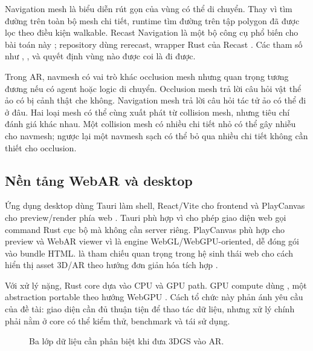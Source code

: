 Navigation mesh là biểu diễn rút gọn của vùng có thể di chuyển. Thay vì tìm đường trên toàn bộ mesh chi tiết, runtime tìm đường trên tập polygon đã được lọc theo điều kiện walkable. Recast Navigation là một bộ công cụ phổ biến cho bài toán này \cite{Recast2009}; repository dùng rerecast, wrapper Rust của Recast \cite{rerecast2023}. Các tham số như , ,  và  quyết định vùng nào được coi là đi được.

Trong AR, navmesh có vai trò khác occlusion mesh nhưng quan trọng tương đương nếu có agent hoặc logic di chuyển. Occlusion mesh trả lời câu hỏi vật thể ảo có bị cảnh thật che không. Navigation mesh trả lời câu hỏi tác tử ảo có thể đi ở đâu. Hai loại mesh có thể cùng xuất phát từ collision mesh, nhưng tiêu chí đánh giá khác nhau. Một collision mesh có nhiều chi tiết nhỏ có thể gây nhiễu cho navmesh; ngược lại một navmesh sạch có thể bỏ qua nhiều chi tiết không cần thiết cho occlusion.

\subsection{Nền tảng WebAR và desktop}

Ứng dụng desktop dùng Tauri làm shell, React/Vite cho frontend và PlayCanvas cho preview/render phía web \cite{Tauri2024,PlayCanvas2024}. Tauri phù hợp vì cho phép giao diện web gọi command Rust cục bộ mà không cần server riêng. PlayCanvas phù hợp cho preview và WebAR viewer vì là engine WebGL/WebGPU-oriented, dễ đóng gói vào bundle HTML.  là tham chiếu quan trọng trong hệ sinh thái web cho cách hiển thị asset 3D/AR theo hướng đơn giản hóa tích hợp \cite{ModelViewer2024}.

Với xử lý nặng, Rust core dựa vào CPU và GPU path. GPU compute dùng , một abstraction portable theo hướng WebGPU \cite{wgpu2024}. Cách tổ chức này phản ánh yêu cầu của đề tài: giao diện cần đủ thuận tiện để thao tác dữ liệu, nhưng xử lý chính phải nằm ở core có thể kiểm thử, benchmark và tái sử dụng.

\begin{figure}[H]
\centering
{}
\caption{Ba lớp dữ liệu cần phân biệt khi đưa 3DGS vào AR.}
\end{figure}
